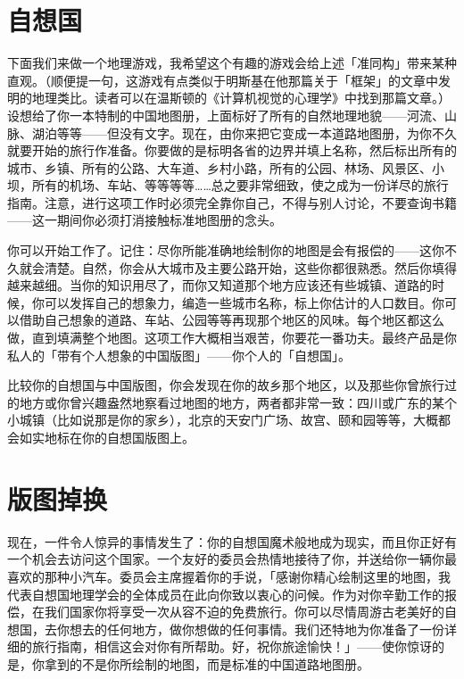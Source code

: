 \documentclass[
  12pt,
  twoside,
  openright,
  oldfontcommands,
]{memoir}
\begin{document}
\section{自想国}

下面我们来做一个地理游戏，我希望这个有趣的游戏会给上述「准同构」带来某种直观。（顺便提一句，这游戏有点类似于明斯基在他那篇关于「框架」的文章中发明的地理类比。读者可以在温斯顿的《计算机视觉的心理学》中找到那篇文章。）设想给了你一本特制的中国地图册，上面标好了所有的自然地理地貌------河流、山脉、湖泊等等------但没有文字。现在，由你来把它变成一本道路地图册，为你不久就要开始的旅行作准备。你要做的是标明各省的边界并填上名称，然后标出所有的城市、乡镇、所有的公路、大车道、乡村小路，所有的公园、林场、风景区、小坝，所有的机场、车站、等等等等\ldots\ldots 总之要非常细致，使之成为一份详尽的旅行指南。注意，进行这项工作时必须完全靠你自己，不得与别人讨论，不要查询书籍------这一期间你必须打消接触标准地图册的念头。

你可以开始工作了。记住：尽你所能准确地绘制你的地图是会有报偿的------这你不久就会清楚。自然，你会从大城市及主要公路开始，这些你都很熟悉。然后你填得越来越细。当你的知识用尽了，而你又知道那个地方应该还有些城镇、道路的时候，你可以发挥自己的想象力，编造一些城市名称，标上你估计的人口数目。你可以借助自己想象的道路、车站、公园等等再现那个地区的风味。每个地区都这么做，直到填满整个地图。这项工作大概相当艰苦，你要花一番功夫。最终产品是你私人的「带有个人想象的中国版图」------你个人的「自想国」。

比较你的自想国与中国版图，你会发现在你的故乡那个地区，以及那些你曾旅行过的地方或你曾兴趣盎然地察看过地图的地方，两者都非常一致：四川或广东的某个小城镇（比如说那是你的家乡），北京的天安门广场、故宫、颐和园等等，大概都会如实地标在你的自想国版图上。

\section{版图掉换}

现在，一件令人惊异的事情发生了：你的自想国魔术般地成为现实，而且你正好有一个机会去访问这个国家。一个友好的委员会热情地接待了你，并送给你一辆你最喜欢的那种小汽车。委员会主席握着你的手说，「感谢你精心绘制这里的地图，我代表自想国地理学会的全体成员在此向你致以衷心的问候。作为对你辛勤工作的报偿，在我们国家你将享受一次从容不迫的免费旅行。你可以尽情周游古老美好的自想国，去你想去的任何地方，做你想做的任何事情。我们还特地为你准备了一份详细的旅行指南，相信这会对你有所帮助。好，祝你旅途愉快！」------使你惊讶的是，你拿到的不是你所绘制的地图，而是标准的中国道路地图册。
\end{document}

